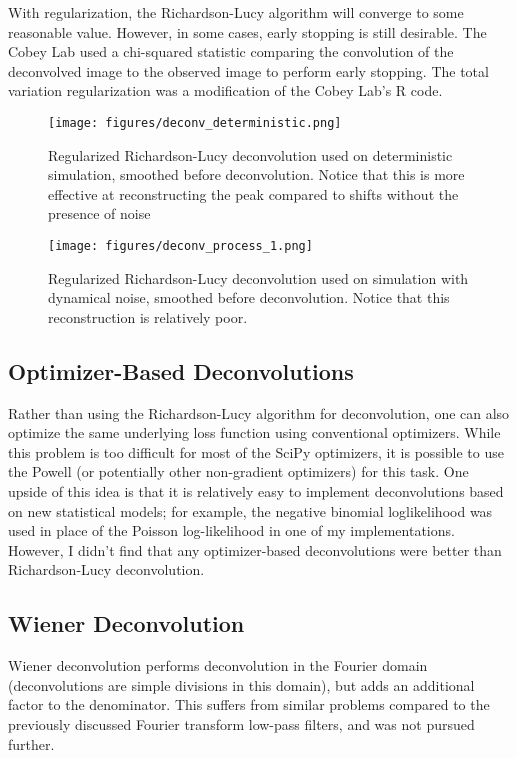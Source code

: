 \documentclass{article}
\begin{document}
With regularization, the Richardson-Lucy algorithm will converge to some reasonable value. However, in some cases, early stopping is still desirable. The Cobey Lab used a chi-squared statistic comparing the convolution of the deconvolved image to the observed image to perform early stopping. The total variation regularization was a modification of the Cobey Lab's R code.

\clearpage
\begin{figure}[h!]
    \centering
    \texttt{[image: figures/deconv\_deterministic.png]}
    \caption{Regularized Richardson-Lucy deconvolution used on deterministic simulation, smoothed before deconvolution. Notice that this is more effective at reconstructing the peak compared to shifts without the presence of noise}
    \label{fig:my_label}
\end{figure}

\clearpage
\begin{figure}[h!]
    \centering
    \texttt{[image: figures/deconv\_process\_1.png]}
    \caption{Regularized Richardson-Lucy deconvolution used on simulation with dynamical noise, smoothed before deconvolution. Notice that this reconstruction is relatively poor.}
    \label{fig:my_label}
\end{figure}

\subsection{Optimizer-Based Deconvolutions}
Rather than using the Richardson-Lucy algorithm for deconvolution, one can also optimize the same underlying loss function using conventional optimizers. While this problem is too difficult for most of the SciPy optimizers, it is possible to use the Powell (or potentially other non-gradient optimizers) for this task. One upside of this idea is that it is relatively easy to implement deconvolutions based on new statistical models; for example, the negative binomial loglikelihood was used in place of the Poisson log-likelihood in one of my implementations. However, I didn't find that any optimizer-based deconvolutions were better than Richardson-Lucy deconvolution.

\subsection{Wiener Deconvolution}
Wiener deconvolution performs deconvolution in the Fourier domain (deconvolutions are simple divisions in this domain), but adds an additional factor to the denominator. This suffers from similar problems compared to the previously discussed Fourier transform low-pass filters, and was not pursued further.
\end{document}
